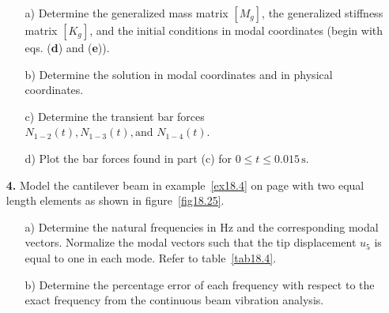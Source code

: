 \documentclass{AeroStructure-ERJohnson}
\begin{document}
\begin{exercise}
\begin{enumerate}[\textbf{2.}]
\begin{enumerate}[b)]
  \item[{\hskip13pt}a)] Determine the generalized mass matrix $\left[M_{g}\right]$, the generalized stiffness matrix $\left[K_{g}\right]$, and the initial\break\hspace*{34pt} conditions in modal coordinates (begin with eqs. (\textbf{d}) and (\textbf{e})).
  \item[{\hskip13pt}b)] Determine the solution in modal coordinates and in physical coordinates.
  \item[{\hskip13pt}c)] Determine the transient bar forces $N_{1-2}(t), N_{1-3}(t), \text{and } N_{1-4}(t)$.
  \item[{\hskip13pt}d)] Plot the bar forces found in part (c) for $0 \leq t \leq 0.015\,\mathrm{s}$.
\end{enumerate}

\item[\textbf{4.}] Model the cantilever beam in example~\ref{ex18.4} on page \pageref{ex18.4} with two equal length elements as shown in figure~\ref{fig18.25}.

{\def\thefigure{18.25}
}

\vspace*{-1pc}



\begin{enumerate}[b)]
  \item[{\hskip13pt}a)] Determine the natural frequencies in Hz and the corresponding modal vectors. Normalize the modal\break\hspace*{34pt} vectors such that the tip displacement $u_5$ is equal to one in each mode. Refer to table~\ref{tab18.4}.
  \item[{\hskip13pt}b)] Determine the percentage error of each frequency with respect to the exact frequency from the continuous\break\hspace*{34pt} beam vibration analysis.


\end{enumerate}
\end{enumerate}
\end{exercise}
\end{document}

